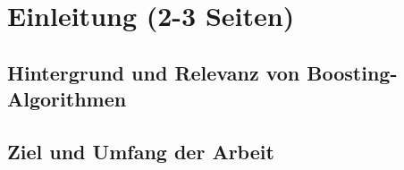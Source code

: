 \section{Einleitung (2-3 Seiten)}
\subsection{Hintergrund und Relevanz von Boosting-Algorithmen}
\subsection{Ziel und Umfang der Arbeit}
